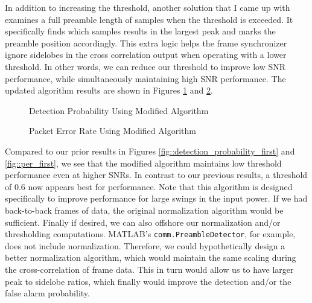 \documentclass{article}
\begin{document}
	In addition to increasing the threshold, another solution that I came up with examines a full preamble length of samples when the threshold is exceeded. It specifically finds which samples results in the largest peak and marks the preamble position accordingly. This extra logic helps the frame synchronizer ignore sidelobes in the cross correlation output when operating with a lower threshold. In other words, we can reduce our threshold to improve low SNR performance, while simultaneously maintaining high SNR performance. The updated algorithm results are shown in Figures \ref{fig::detection_probability_mod} and \ref{fig::per_mod}.
	
\begin{figure}[H]
	\centerline{}
	\caption{Detection Probability Using Modified Algorithm}
	\label{fig::detection_probability_mod}
\end{figure}

\begin{figure}[H]
	\centerline{}
	\caption{Packet Error Rate Using Modified Algorithm}
	\label{fig::per_mod}
\end{figure}

\noindent Compared to our prior results in Figures \ref{fig::detection_probability_first} and \ref{fig::per_first}, we see that the modified algorithm maintains low threshold performance even at higher SNRs. In contrast to our previous results, a threshold of 0.6 now appears best for performance. Note that this algorithm is designed specifically to improve performance for large swings in the input power. If we had back-to-back frames of data, the original normalization algorithm would be sufficient. Finally if desired, we can also offshore our normalization and/or thresholding computations. MATLAB's \texttt{comm.PreambleDetector}, for example, does not include normalization. Therefore, we could hypothetically design a better normalization algorithm, which would maintain the same scaling during the cross-correlation of frame data. This in turn would allow us to have larger peak to sidelobe ratios, which finally would improve the detection and/or the false alarm probability.
\end{document}
